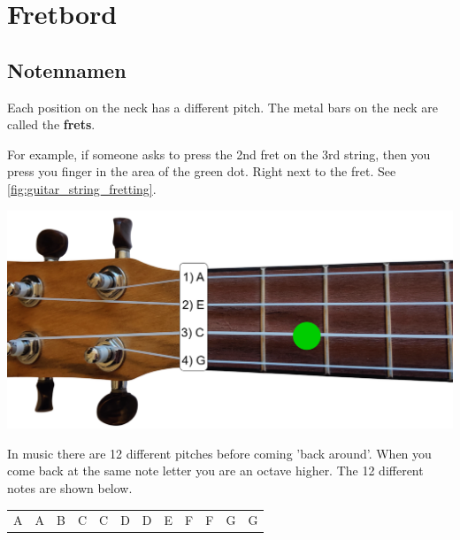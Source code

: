\section{Fretbord}

\subsection{Notennamen}

\begin{minipage}[b]{0.48\textwidth}
Each position on the neck has a different pitch. The metal bars on the neck are called the \textbf{frets}.

For example, if someone asks to press the 2nd fret on the 3rd string, then you press you finger in the area of the green dot. Right next to the fret. See \ref{fig:guitar_string_fretting}.
\end{minipage}
\hfill
\begin{minipage}{0.48\textwidth}
    \centering
    \includegraphics[width=\textwidth]{../Images/ukulele-neck-fretting.png}
    \label{fig:ukulele_string_fretting}
\end{minipage}

In music there are 12 different pitches before coming 'back around'. When you come back at the same note letter you are an octave higher. The 12 different notes are shown below.

\begin{table}[h]
	\centering
	\begin{tabular}{*{12}{P{5mm}}}
		\large{A} & \large{A\sharp} & \large{B} & \large{C} & \large{C\sharp} & \large{D} & \large{D\sharp} & \large{E} & \large{F} & \large{F\sharp} & \large{G} & \large{G\sharp}
	\end{tabular}
\end{table}


